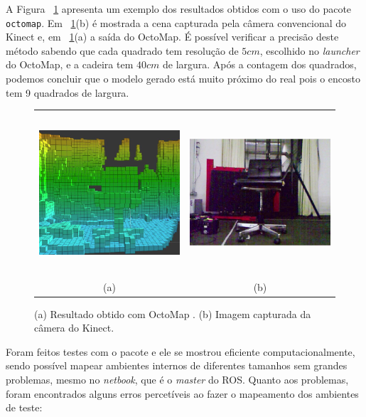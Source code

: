 A Figura ~\ref{fig:cadeiraOctomap} apresenta um exemplo dos resultados obtidos com o uso do pacote \verb|octomap|. Em ~\ref{fig:cadeiraOctomap}(b) é mostrada a cena capturada pela câmera convencional do Kinect e, em ~\ref{fig:cadeiraOctomap}(a) a saída do OctoMap. É possível verificar a precisão deste método sabendo que cada quadrado tem resolução de $5cm$, escolhido no \textit{launcher} do OctoMap, e a cadeira tem $40cm$ de largura. Após a contagem dos quadrados, podemos concluir que o modelo gerado está muito próximo do real pois o encosto tem 9 quadrados de largura.

\begin{figure}[H]
\centering
\begin{tabular}{cc}
  \includegraphics[width=6cm, height=6cm]{images/cadeiraOctomap.PNG} &
  \includegraphics[width=6cm, height=6cm]{images/cadeiraKinect.jpg} \\
 (a) & (b)
\end{tabular} 
\caption{\small{(a) Resultado obtido com OctoMap \cite{hornung13auro}. (b) Imagem capturada da câmera do Kinect.}}
\label{fig:cadeiraOctomap}
\end{figure}

Foram feitos testes com o pacote e ele se mostrou eficiente computacionalmente, sendo possível mapear ambientes internos de diferentes tamanhos sem grandes problemas, mesmo no \textit{netbook}, que é o \textit{master} do ROS. Quanto aos problemas, foram encontrados alguns erros percetíveis ao fazer o mapeamento dos ambientes de teste:

